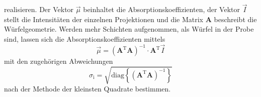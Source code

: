 realisieren.
Der Vektor $\vec{\mu}$ beinhaltet die
Absorptionskoeffizienten,
der Vektor $\vec{I}$ stellt die Intensitäten der einzelnen Projektionen
und die Matrix $\mathbf{A}$ beschreibt die Würfelgeometrie.
Werden mehr Schichten aufgenommen, als Würfel in der Probe sind, lassen sich
die Absorptionskoeffizienten mittels
\begin{equation}
  \vec{\mu} = \left(\mathbf{A}^\text{T} \mathbf{A}\right)^{-1} \cdot
  \mathbf{A}^\text{T} \vec{I}
  \label{eqn:least-squares}
\end{equation}
mit den zugehörigen Abweichungen
\begin{equation}
  \sigma_\text{i} =
  \sqrt{\text{diag}\left\{\left(\mathbf{A}^\text{T} \mathbf{A}\right)^{-1}\right\}}
  \label{eqn:least-squares-error}
\end{equation}
nach der Methode der kleinsten Quadrate bestimmen.
